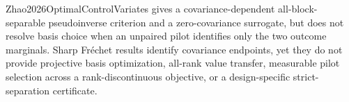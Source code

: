 Zhao2026OptimalControlVariates gives a covariance-dependent all-block-separable pseudoinverse criterion and a zero-covariance surrogate, but does not resolve basis choice when an unpaired pilot identifies only the two outcome marginals.  Sharp Fr\'echet results identify covariance endpoints, yet they do not provide projective basis optimization, all-rank value transfer, measurable pilot selection across a rank-discontinuous objective, or a design-specific strict-separation certificate.